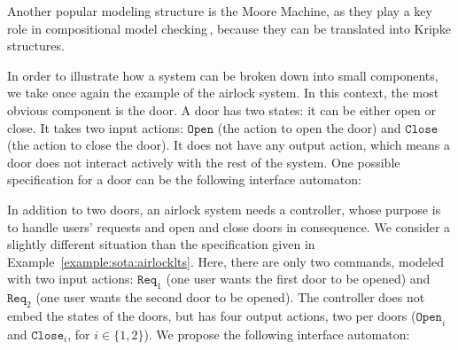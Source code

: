 Another popular modeling structure is the Moore Machine, as they play a key role
in compositional model checking\,\cite{mcmillan1989compositional}, because they
can be translated into Kripke structures.

\begin{example}
  \label{example:sota:airlockinterface}

  In order to illustrate how a system can be broken down into small components,
  we take once again the example of the airlock system.
  In this context, the most obvious component is the door.
  A door has two states: it can be either open or close.
  It takes two input actions: \( \mathtt{Open} \) (the action to open the door)
  and \( \mathtt{Close} \) (the action to close the door).
  It does not have any output action, which means a door does not interact
  actively with the rest of the system.
  One possible specification for a door can be the following interface
  automaton:

  \begin{center}
  \end{center}

  In addition to two doors, an airlock system needs a controller, whose purpose
  is to handle users' requests and open and close doors in consequence.
  We consider a slightly different situation than the specification given in
  Example~\ref{example:sota:airlocklts}.
  Here, there are only two commands, modeled with two input actions:
  \( \mathtt{Req}_1 \) (one user wants the first door to be opened) and
  \( \mathtt{Req}_2 \) (one user wants the second door to be opened).
  The controller does not embed the states of the doors, but has four output
  actions, two per doors (\( \mathtt{Open}_i \) and \( \mathtt{Close}_i\), for
  \( i \in \{1, 2\}\)).
  We propose the following interface automaton:


\end{example}
